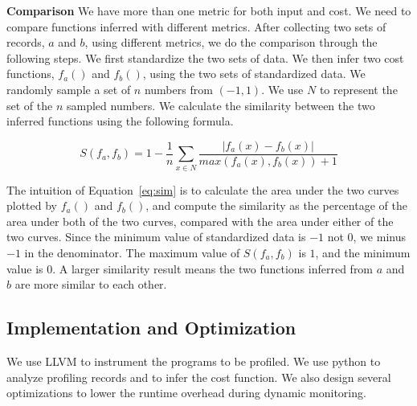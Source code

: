 \noindent\textbf{Comparison}
We have more than one metric for both input and cost.
We need to compare functions inferred with different metrics. 
After collecting two sets of records, $a$ and $b$, using different metrics, 
we do the comparison through the following steps. 
We first standardize the two sets of data. 
We then infer two cost functions, $f_a()$ and $f_b()$, 
using the two sets of standardized data.
We randomly sample a set of $n$ numbers from $(-1, 1)$.
We use $N$ to represent the set of the $n$ sampled numbers.  
We calculate the similarity between the two inferred 
functions using the following formula. 



\begin{equation} \label{eq:sim}
S(f_a, f_b) = 1 - \frac{1}{n}\sum_{x \in N}\frac{|f_a(x) - f_b(x)|}{max(f_a(x),f_b(x))+1}
\end{equation}

The intuition of Equation~\ref{eq:sim} is to calculate the area under the two curves 
plotted by $f_a()$ and $f_b()$, 
and compute the similarity as the percentage of the area under both of the two curves, 
compared with the area under either of the two curves.
Since the minimum value of standardized data is $-1$ not $0$,
we minus $-1$ in the denominator.
The maximum value of $S(f_a, f_b)$ is $1$, and the minimum value is $0$.
A larger similarity result means the two functions inferred 
from $a$ and $b$ are more similar to each other. 



\subsection{Implementation and Optimization}

We use LLVM\cite{llvm} to instrument the programs to be profiled.
We use python to analyze profiling records 
and to infer the cost function. 
We also design several optimizations to lower the runtime overhead 
during dynamic monitoring.  

